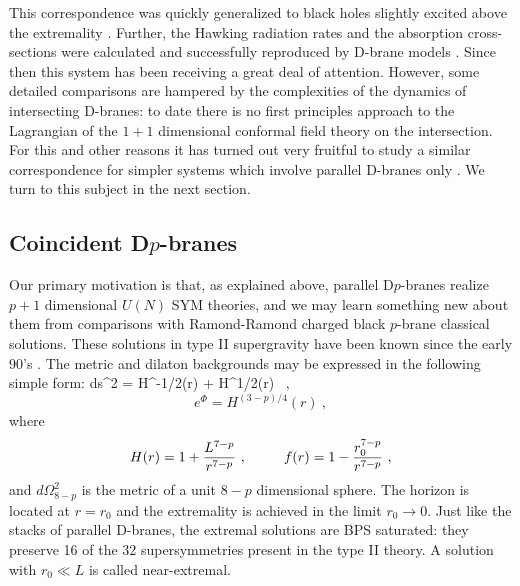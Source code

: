 This correspondence was quickly generalized to black 
holes slightly excited above the extremality \cite{cm,HSS}. 
Further, the Hawking radiation rates and the absorption cross-sections
were calculated and successfully reproduced by D-brane models
\cite{cm,wad}.
Since then this system has been
receiving a great deal of attention.
However, some detailed comparisons are hampered by the complexities of the
dynamics of intersecting D-branes: to date there is no 
first principles approach to the Lagrangian of the $1+1$ dimensional 
conformal field theory on the intersection. 
For this and other reasons it has turned out 
very fruitful to study a similar correspondence
for simpler systems which involve parallel D-branes 
only \cite{gkp,ENT,kleb,gukt,gkThree}. We turn to this subject
in the next section.

\subsection{Coincident D$p$-branes}

Our primary motivation is that, as explained above, parallel
D$p$-branes realize $p+1$ dimensional $U(N)$ SYM theories, and we may
learn something new about them from comparisons with Ramond-Ramond
charged black $p$-brane
classical solutions. These solutions in type II supergravity have been
known since the early 90's \cite{hs,DL}.
The metric and dilaton backgrounds may be expressed in the following
simple form:
\be
\label{metric}
   ds^2 =
H^{-1/2}(r)
    \left[ - f(r) dt^2 + \sum_{i=1}^p (d x^i)^2 \right] +
H^{1/2}(r)
     \ ,
\ee
$$ e^\Phi = H^{(3-p)/4}(r)\ ,
$$
where
$$   H(r)  = 1 + {L^{7-p} \over r^{7-p}} \ , \qquad \  \  
f(r) = 1- {r_0^{7-p}\over
r^{7-p}}
\ ,
$$
and $d\Omega_{8-p}^2$ is the metric of a unit $8-p$ dimensional sphere.
The horizon is located at $r=r_0$ and the extremality
is achieved in the limit $r_0 \rightarrow 0$.
Just like the stacks of parallel D-branes, the extremal solutions are 
BPS saturated: they preserve 16 of the 32 supersymmetries present
in the type II theory. 
A solution with $r_0\ll L$ is called near-extremal.

